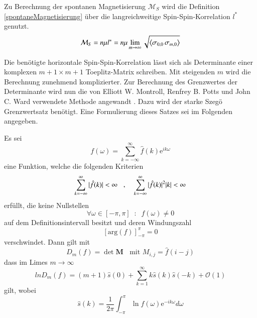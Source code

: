 
Zu Berechnung der spontanen Magnetisierung $\mathcal{M}_S$  wird die Definition \eqref{spontaneMagnetisierung} über die langreichweitige Spin-Spin-Korrelation $l^*$
genutzt.
\begin{equation}
\mathcal{M}_S   = n \mu l^* = n \mu \lim_{m \rightarrow \infty} \sqrt{\left\langle \sigma_{0,0}\,\sigma_{m,0} \right\rangle} 
\end{equation}

\noindent Die benötigte horizontale Spin-Spin-Korrelation lässt sich als Determinante einer komplexen $m+1 \times m+1$ Toeplitz-Matrix schreiben. Mit steigenden $m$ wird die Berechnung zunehmend komplizierter. Zur Berechnung des Grenzwertes der Determinante wird nun die von Elliott W. Montroll, Renfrey B. Potts und John C. Ward verwendete Methode angewandt \cite{Montroll_Potts_Ward}. Dazu wird der starke Szegö Grenzwertsatz benötigt. Eine Formulierung dieses Satzes sei im Folgenden angegeben.    



\begin{grayframe}[frametitle = {Starker Grenzwertsatz von Szegö \cite{StrongSzegoeTheorem_Silbermann} }] %
Es sei 
\begin{equation}
f(\omega) = \sum_{k = -\infty}^{\infty} \hat{f}(k)\mathrm{e}^{i k \omega}
\end{equation}
eine Funktion, welche die folgenden Kriterien 
\begin{equation} \label{eq: szego condition}
\sum_{k = -\infty}^{\infty} |\hat{f}(k)| < \infty \;\;\;\text{, }\;\;\;
\sum_{k = -\infty}^{\infty} |\hat{f}(k)|^2 |k| < \infty \\
\end{equation}
erfüllt, die  keine Nullstellen 
\begin{equation}
\forall \omega \in [-\pi,\pi]\;\; :\;\; f(\omega) \neq 0
\end{equation}
auf dem Definitionsintervall besitzt und deren Windungszahl 
\begin{equation}
\left[\mathrm{arg}\left( f\right)\right]_{-\pi}^{\pi} = 0 
\end{equation}
verschwindet. Dann gilt mit
\begin{equation}
D_m(f) = \det{\bm{M}} \;\;\text{ mit}\,\, M_{i,j} = \hat{f}(i-j) 
\end{equation}
dass im Limes $m \rightarrow \infty$ 
\begin{equation}
ln{D_m(f)} = (m+1)\hat{s}(0) + \sum_{k = 1}^{\infty} k \hat{s}(k)\hat{s}(-k) + { \scriptstyle \mathcal{O}}(1)
\end{equation}
gilt, wobei
\begin{equation}
\hat{s}(k) = \frac{1}{2 \pi }  \int_{-\pi}^{\pi} \ln{f(\omega)} \mathrm{e}^{-i k \omega} d \omega 
\end{equation}
\end{grayframe}

